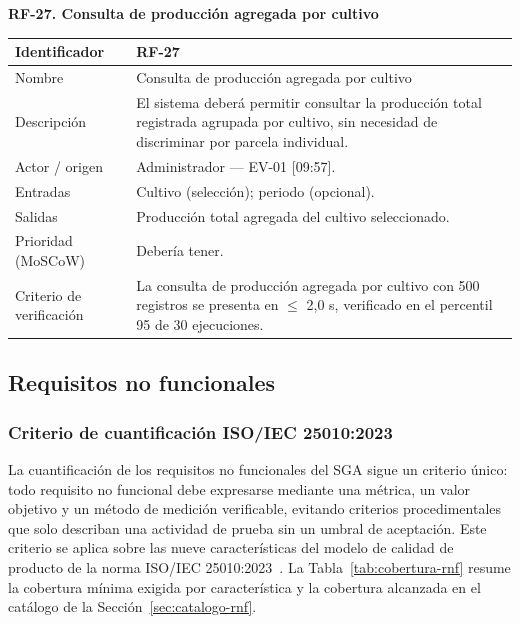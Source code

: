 \documentclass[12pt,a4paper]{article}
\begin{document}
\bigskip
\noindent\textbf{RF-27. Consulta de producción agregada por cultivo}
\label{tab:RF-27}

\begin{center}
\begin{longtable}{|p{3.5cm}|p{10.7cm}|}
\hline
Identificador & RF-27 \\
\hline
Nombre & Consulta de producción agregada por cultivo \\
\hline
Descripción & El sistema deberá permitir consultar la producción total registrada agrupada por cultivo, sin necesidad de discriminar por parcela individual. \\
\hline
Actor / origen & Administrador --- EV-01 [09:57]. \\
\hline
Entradas & Cultivo (selección); periodo (opcional). \\
\hline
Salidas & Producción total agregada del cultivo seleccionado. \\
\hline
Prioridad (MoSCoW) & Debería tener. \\
\hline
Criterio de verificación & La consulta de producción agregada por cultivo con 500 registros se presenta en $\leq$ 2,0 s, verificado en el percentil 95 de 30 ejecuciones. \\
\hline
\end{longtable}
\end{center}

\subsection{Requisitos no funcionales}
\label{sec:requisitos-no-funcionales}

\subsubsection{Criterio de cuantificación ISO/IEC 25010:2023}
\label{sec:criterio-cuantificacion-rnf}

La cuantificación de los requisitos no funcionales del SGA sigue un criterio único: todo requisito no funcional debe expresarse mediante una métrica, un valor objetivo y un método de medición verificable, evitando criterios procedimentales que solo describan una actividad de prueba sin un umbral de aceptación. Este criterio se aplica sobre las nueve características del modelo de calidad de producto de la norma ISO/IEC 25010:2023~\cite{iso25010-2023}. La Tabla~\ref{tab:cobertura-rnf} resume la cobertura mínima exigida por característica y la cobertura alcanzada en el catálogo de la Sección~\ref{sec:catalogo-rnf}.
\end{document}
